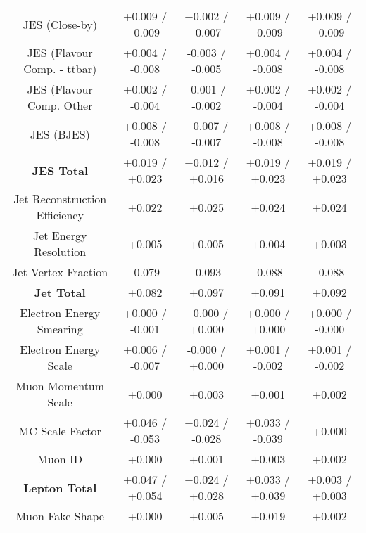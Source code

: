 \begin{table}[htbp]
\begin{center}
\begin{tabular}{|c|c|c|c|c|}
JES (Close-by)                        &+0.009   / -0.009   & +0.002   / -0.007   & +0.009   / -0.009   & +0.009   / -0.009  \\
JES (Flavour Comp. - ttbar)           &+0.004   / -0.008   & -0.003   / -0.005   & +0.004   / -0.008   & +0.004   / -0.008  \\
JES (Flavour Comp. Other              &+0.002   / -0.004   & -0.001   / -0.002   & +0.002   / -0.004   & +0.002   / -0.004  \\
JES (BJES)                            &+0.008   / -0.008   & +0.007   / -0.007   & +0.008   / -0.008   & +0.008   / -0.008  \\
\hline
\textbf{JES Total}                    &+0.019   / +0.023   & +0.012   / +0.016   & +0.019   / +0.023   & +0.019   / +0.023  \\
\hline
Jet Reconstruction Efficiency         &+0.022              & +0.025              & +0.024              & +0.024             \\
Jet Energy Resolution                 &+0.005              & +0.005              & +0.004              & +0.003             \\
Jet Vertex Fraction                   &-0.079              & -0.093              & -0.088              & -0.088             \\
\hline
\textbf{Jet Total}                    &+0.082              & +0.097              & +0.091              & +0.092             \\
\hline
Electron Energy Smearing              &+0.000   / -0.001   & +0.000   / +0.000   & +0.000   / +0.000   & +0.000   / -0.000  \\
Electron Energy Scale                 &+0.006   / -0.007   & -0.000   / +0.000   & +0.001   / -0.002   & +0.001   / -0.002  \\
Muon Momentum Scale                   &+0.000              & +0.003              & +0.001              & +0.002             \\
MC Scale Factor                       &+0.046   / -0.053   & +0.024   / -0.028   & +0.033   / -0.039   & +0.000             \\
Muon ID                               &+0.000              & +0.001              & +0.003              & +0.002             \\
\hline
\textbf{Lepton Total}                 &+0.047   / +0.054   & +0.024   / +0.028   & +0.033   / +0.039   & +0.003   / +0.003  \\
\hline
Muon Fake Shape                       &+0.000              & +0.005              & +0.019              & +0.002             \\

\end{tabular}
\end{center}
\end{table}
